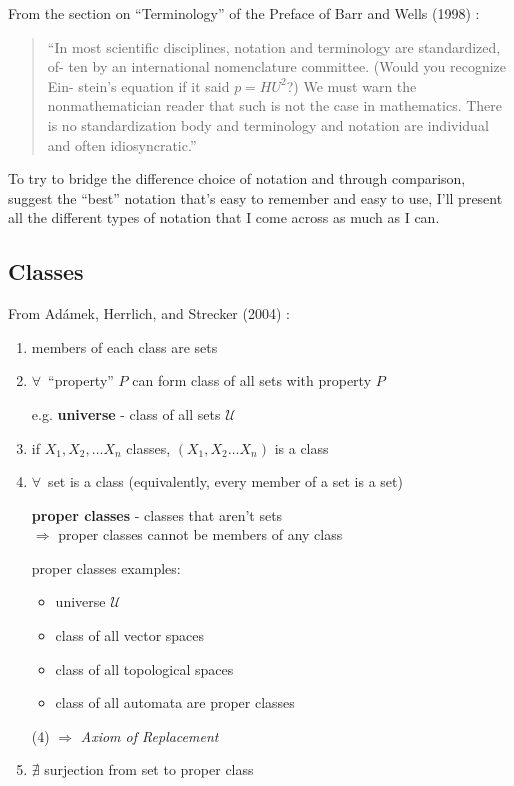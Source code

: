 \documentclass[twoside,landscape,10pt]{amsart}
\theoremstyle{plain}
\theoremstyle{definition}
\theoremstyle{remark}
\begin{document}
\begin{multicols*}{2}


From the section on ``Terminology'' of the Preface of Barr and Wells (1998) \cite{BW1998}:

\begin{quote}
``In most scientific disciplines, notation and terminology are standardized, of- ten by an international nomenclature committee. (Would you recognize Ein- stein’s equation if it said $p = HU^2$?) We must warn the nonmathematician reader that such is not the case in mathematics. There is no standardization body and terminology and notation are individual and often idiosyncratic.''
\end{quote}

To try to bridge the difference choice of notation and through comparison, suggest the ``best'' notation that's easy to remember and easy to use, I'll present all the different types of notation that I come across as much as I can.  

\subsection{Classes}

From Ad\'{a}mek, Herrlich, and Strecker (2004) \cite{AHS2004}:

\begin{enumerate}
  \item members of each class are sets
  \item $\forall \, $ ``property'' $P$ can form class of all sets with property $P$ 

e.g. \textbf{universe} - class of all sets $\mathcal{U}$
\item if $X_1,X_2, \dots X_n$ classes, $(X_1, X_2 \dots X_n)$ is a class
  \item $\forall \, $ set is a class (equivalently, every member of a set is a set)
  
    \textbf{ proper classes } - classes that aren't sets \\
    $\Longrightarrow $ proper classes cannot be members of any class

proper classes examples: 
\begin{itemize}
  \item universe $\mathcal{U}$  
  \item class of all vector spaces
  \item class of all topological spaces
  \item class of all automata are proper classes
\end{itemize}
 (4) $\Longrightarrow$ \emph{Axiom of Replacement}  
\item $\nexists $ surjection from set to proper class
\end{enumerate}


\end{multicols*}
\end{document}

